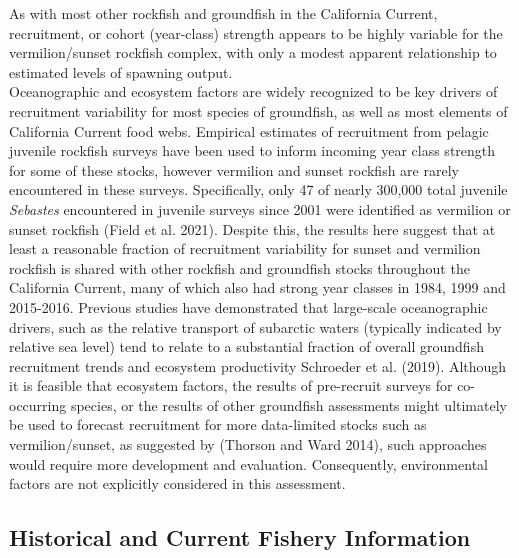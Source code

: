 \documentclass[11pt,
  english,
  a4paper,
]{article}
\begin{document}
As with most other rockfish and groundfish in the California Current, recruitment, or cohort (year-class) strength appears to be highly variable for the vermilion/sunset rockfish complex, with only a modest apparent relationship to estimated levels of spawning output.\\
Oceanographic and ecosystem factors are widely recognized to be key drivers of recruitment variability for most species of groundfish, as well as most elements of California Current food webs. Empirical estimates of recruitment from pelagic juvenile rockfish surveys have been used to inform incoming year class strength for some of these stocks, however vermilion and sunset rockfish are rarely encountered in these surveys. Specifically, only 47 of nearly 300,000 total juvenile \emph{Sebastes} encountered in juvenile surveys since 2001 were identified as vermilion or sunset rockfish {(Field et al. 2021)\leavevmode\tagmcend\tagstructend}. Despite this, the results here suggest that at least a reasonable fraction of recruitment variability for sunset and vermilion rockfish is shared with other rockfish and groundfish stocks throughout the California Current, many of which also had strong year classes in 1984, 1999 and 2015-2016. Previous studies have demonstrated that large-scale oceanographic drivers, such as the relative transport of subarctic waters (typically indicated by relative sea level) tend to relate to a substantial fraction of overall groundfish recruitment trends and ecosystem productivity {Schroeder et al. (2019)\leavevmode\tagmcend\tagstructend}. Although it is feasible that ecosystem factors, the results of pre-recruit surveys for co-occurring species, or the results of other groundfish assessments might ultimately be used to forecast recruitment for more data-limited stocks such as vermilion/sunset, as suggested by {(Thorson and Ward 2014)\leavevmode\tagmcend\tagstructend}, such approaches would require more development and evaluation. Consequently, environmental factors are not explicitly considered in this assessment.


\hypertarget{historical-and-current-fishery-information}{%
\subsection{Historical and Current Fishery Information}\label{historical-and-current-fishery-information}}
\end{document}
